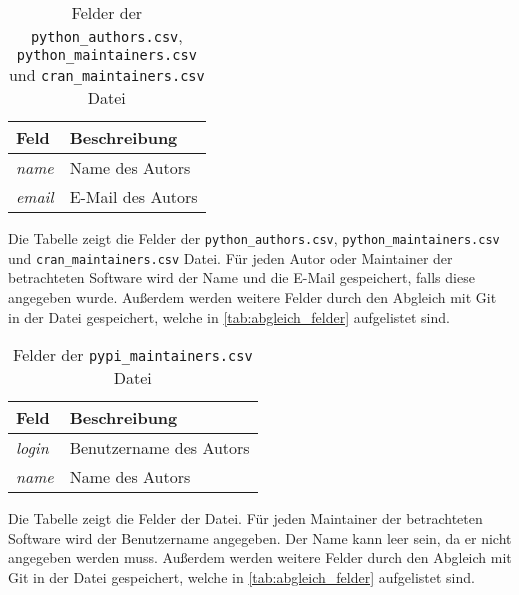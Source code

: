 \begin{table}
    \centering
    \setlength{\tabcolsep}{8pt}
    \begin{tabular}{p{3.5cm}|p{10cm}}
        \toprule
        \textbf{Feld} & \textbf{Beschreibung} \\ \midrule
        \emph{name} & Name des Autors \\
        \emph{email} & E-Mail des Autors \\
        \bottomrule
    \end{tabular}
    \caption{Felder der \texttt{python\_authors.csv}, \texttt{python\_maintainers.csv} und \texttt{cran\_maintainers.csv} Datei}
    \label{tab:python_authors}
    \small
    Die Tabelle zeigt die Felder der \texttt{python\_authors.csv}, \texttt{python\_maintainers.csv} und \texttt{cran\_maintainers.csv} Datei. Für jeden Autor oder Maintainer der betrachteten Software wird der Name und die E-Mail gespeichert, falls diese angegeben wurde. Außerdem werden weitere Felder durch den Abgleich mit Git in der Datei gespeichert, welche in \autoref{tab:abgleich_felder} aufgelistet sind.
\end{table}

\begin{table}
    \centering
    \setlength{\tabcolsep}{8pt}
    \begin{tabular}{p{3.5cm}|p{10cm}}
        \toprule
        \textbf{Feld} & \textbf{Beschreibung} \\ \midrule
        \emph{login} & Benutzername des Autors \\
        \emph{name} & Name des Autors \\
        \bottomrule
    \end{tabular}
    \caption{Felder der \texttt{pypi\_maintainers.csv} Datei}
    \label{tab:pypi_maintainers}
    \small
    Die Tabelle zeigt die Felder der  Datei. Für jeden Maintainer der betrachteten Software wird der Benutzername angegeben. Der Name kann leer sein, da er nicht angegeben werden muss. Außerdem werden weitere Felder durch den Abgleich mit Git in der Datei gespeichert, welche in \autoref{tab:abgleich_felder} aufgelistet sind.
\end{table}

